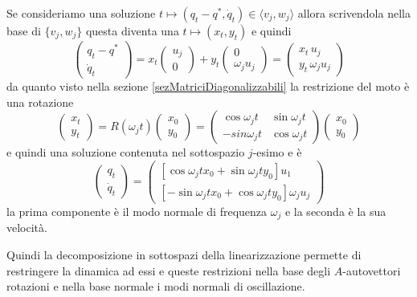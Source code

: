 \documentclass[11pt,a4paper,twoside]{book}
\theoremstyle{esss}
\theoremstyle{dotless}
\numberwithin{equation}{section} %
\begin{document}
Se consideriamo una soluzione $t\mapsto (q_t-q^*,\dot{q}_t)\in \langle v_j,w_j\rangle$ allora scrivendola nella base di $\{v_j,w_j\}$ questa diventa una $t\mapsto(x_t,y_t)$ e quindi
\[
\left(\begin{array}{c} q_t - q^* \\ \dot{q}_t \end{array}\right) = x_t \left(\begin{array}{c} u_j \\ 0 \end{array}\right) + y_t \left(\begin{array}{c} 0 \\ \omega_j u_j \end{array}\right)=\left(\begin{array}{c}
x_t \, u_j \\ y_t \, \omega_j u_j
\end{array}\right)
\]
da quanto visto nella sezione \ref{sezMatriciDiagonalizzabili} la restrizione del moto è una rotazione
\[
\left(\begin{array}{c}
x_t \\ y_t \end{array}\right) = R(\omega_j t)\left( \begin{array}{c}
x_0 \\ y_0 \end{array}\right)=\left(\begin{array}{cc}
\cos{\omega_j  t} & \sin{\omega_j t} \\ -sin{\omega_j t} & \cos{\omega_j t} \end{array} \right) \left(\begin{array}{c}
x_0 \\ y_0 \end{array}\right)
\]
e quindi una soluzione contenuta nel sottospazio $j$-esimo e è
\[
\left(\begin{array}{c}
q_t \\ \dot{q}_t \end{array}\right) = \left(\begin{array}{c}
\left[ \cos{\omega_j t} x_0 + \sin{\omega_j t} y_0 \right] u_1 \\
\left[ -\sin{\omega_j t}x_0 + \cos{\omega_j t} y_0 \right] \omega_j u_j 
\end{array}\right)
\]
la prima componente è il modo normale di frequenza $\omega_j$ e la seconda è la sua velocità.

Quindi la decomposizione in sottospazi della linearizzazione permette di restringere la dinamica ad essi e queste restrizioni nella base degli $A$-autovettori rotazioni e nella base normale i modi normali di oscillazione.
\end{document}
